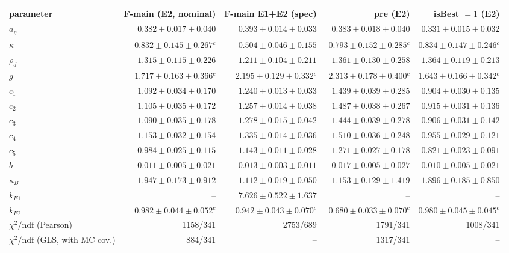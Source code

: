 \begin{tabular}{lrrrr}
\toprule
parameter & F-main (E2, nominal) & F-main E1+E2 (spec) & pre (E2) & isBest $=1$ (E2) \\
\midrule
$a_\eta$ & $0.382 \pm 0.017 \pm 0.040$ & $0.393 \pm 0.014 \pm 0.033$ & $0.383 \pm 0.018 \pm 0.040$ & $0.331 \pm 0.015 \pm 0.032$ \\
$\kappa$ & $0.832 \pm 0.145 \pm 0.267$$^{c}$ & $0.504 \pm 0.046 \pm 0.155$ & $0.793 \pm 0.152 \pm 0.285$$^{c}$ & $0.834 \pm 0.147 \pm 0.246$$^{c}$ \\
$\rho_d$ & $1.315 \pm 0.115 \pm 0.226$ & $1.211 \pm 0.104 \pm 0.211$ & $1.361 \pm 0.130 \pm 0.258$ & $1.364 \pm 0.119 \pm 0.213$ \\
$g$ & $1.717 \pm 0.163 \pm 0.366$$^{c}$ & $2.195 \pm 0.129 \pm 0.332$$^{c}$ & $2.313 \pm 0.178 \pm 0.400$$^{c}$ & $1.643 \pm 0.166 \pm 0.342$$^{c}$ \\
$c_1$ & $1.092 \pm 0.034 \pm 0.170$ & $1.240 \pm 0.013 \pm 0.033$ & $1.439 \pm 0.039 \pm 0.285$ & $0.904 \pm 0.030 \pm 0.135$ \\
$c_2$ & $1.105 \pm 0.035 \pm 0.172$ & $1.257 \pm 0.014 \pm 0.038$ & $1.487 \pm 0.038 \pm 0.267$ & $0.915 \pm 0.031 \pm 0.136$ \\
$c_3$ & $1.090 \pm 0.035 \pm 0.178$ & $1.278 \pm 0.015 \pm 0.042$ & $1.444 \pm 0.039 \pm 0.278$ & $0.906 \pm 0.031 \pm 0.142$ \\
$c_4$ & $1.153 \pm 0.032 \pm 0.154$ & $1.335 \pm 0.014 \pm 0.036$ & $1.510 \pm 0.036 \pm 0.248$ & $0.955 \pm 0.029 \pm 0.121$ \\
$c_5$ & $0.984 \pm 0.025 \pm 0.115$ & $1.143 \pm 0.011 \pm 0.028$ & $1.271 \pm 0.027 \pm 0.178$ & $0.821 \pm 0.023 \pm 0.091$ \\
$b$ & $-0.011 \pm 0.005 \pm 0.021$ & $-0.013 \pm 0.003 \pm 0.011$ & $-0.017 \pm 0.005 \pm 0.027$ & $0.010 \pm 0.005 \pm 0.021$ \\
$\kappa_B$ & $1.947 \pm 0.173 \pm 0.912$ & $1.112 \pm 0.019 \pm 0.050$ & $1.153 \pm 0.129 \pm 1.419$ & $1.896 \pm 0.185 \pm 0.850$ \\
$k_{E1}$ & -- & $7.626 \pm 0.522 \pm 1.637$ & -- & -- \\
$k_{E2}$ & $0.982 \pm 0.044 \pm 0.052$$^{c}$ & $0.942 \pm 0.043 \pm 0.070$$^{c}$ & $0.680 \pm 0.033 \pm 0.070$$^{c}$ & $0.980 \pm 0.045 \pm 0.045$$^{c}$ \\
\midrule
$\chi^2/\mathrm{ndf}$ (Pearson) & 1158/341 & 2753/689 & 1791/341 & 1008/341 \\
$\chi^2/\mathrm{ndf}$ (GLS, with MC cov.) & 884/341 & -- & 1317/341 & -- \\
\bottomrule
\end{tabular}

